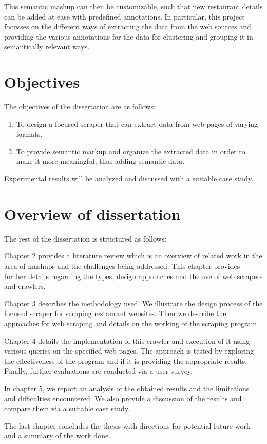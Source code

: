 This semantic mashup can then be customizable, such that new restaurant details can be added at ease with predefined annotations. In particular, this project focusses on the different ways of extracting the data from the web sources and providing the various annotations for the data for clustering and grouping it in semantically relevant ways.

\section{Objectives}
The objectives of the dissertation are as follows:

\begin{enumerate}
\item To design a focused scraper that can extract data from web pages of varying formats.
\item To provide semantic markup and organize the extracted data in order to make it more meaningful, thus adding semantic data.
\end{enumerate}

Experimental results will be analyzed and discussed with a suitable case study.

\section{Overview of dissertation}
The rest of the dissertation is structured as follows:

Chapter 2 provides a literature review which is an overview of related work in the area of mashups and the challenges being addressed. This chapter provides further details regarding the types, design approaches and the use of web scrapers and crawlers.

Chapter 3 describes the methodology used. We illustrate the design process of the focused scraper for scraping restaurant websites. Then we describe the approaches for web scraping and details on the working of the scraping program.

Chapter 4 details the implementation of this crawler and execution of it using various queries on the specified web pages. The approach is tested by exploring the effectiveness of the program and if it is providing the appropriate results. Finally, further evaluations are conducted via a user survey.

In chapter 5, we report an analysis of the obtained results and the limitations and difficulties encountered. We also provide a discussion of the results and compare them via a suitable case study.

The last chapter concludes the thesis with directions for potential future work and a summary of the work done.
